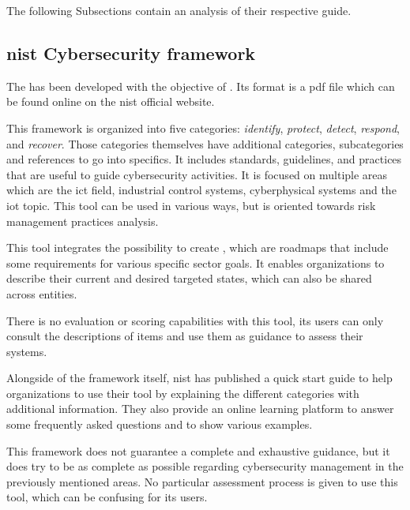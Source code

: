 The following Subsections contain an analysis of their respective guide.

\subsection{\gls*{nist} Cybersecurity \Gls*{framework}}
\label{subsec:comparison_analyse_nist}

The  has been developed with the objective of . Its format is a \gls{pdf} file which can be found online on the \gls{nist} official website. 

This \gls{framework} is organized into five categories: \textit{identify}, \textit{protect}, \textit{detect}, \textit{respond}, and \textit{recover}. Those categories themselves have additional categories, subcategories and references to go into specifics. It includes standards, guidelines, and practices that are useful to guide cybersecurity activities. It is focused on multiple areas which are the \gls{ict} field, industrial control systems, cyberphysical systems and the \gls{iot} topic. This tool can be used in various ways, but is oriented towards risk management practices analysis.

This tool integrates the possibility to create , which are roadmaps that include some requirements for various specific sector goals. It enables organizations to describe their current and desired targeted states, which can also be shared across entities.

There is no evaluation or scoring capabilities with this tool, its users can only consult the descriptions of items and use them as guidance to assess their systems.

Alongside of the \gls{framework} itself, \gls{nist} has published a quick start guide to help organizations to use their tool by explaining the different categories with additional information. They also provide an online learning platform to answer some frequently asked questions and to show various examples.

This \gls{framework} does not guarantee a complete and exhaustive guidance, but it does try to be as complete as possible regarding cybersecurity management in the previously mentioned areas. No particular assessment process is given to use this tool, which can be confusing for its users.

